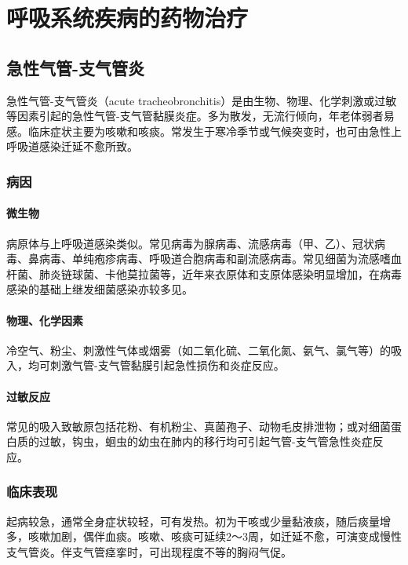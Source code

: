 \chapter{呼吸系统疾病的药物治疗}

\section{急性气管-支气管炎}

急性气管-支气管炎（acute
tracheobronchitis）是由生物、物理、化学刺激或过敏等因素引起的急性气管-支气管黏膜炎症。多为散发，无流行倾向，年老体弱者易感。临床症状主要为咳嗽和咳痰。常发生于寒冷季节或气候突变时，也可由急性上呼吸道感染迁延不愈所致。

\subsection{病因}

\subsubsection{微生物}

病原体与上呼吸道感染类似。常见病毒为腺病毒、流感病毒（甲、乙）、冠状病毒、鼻病毒、单纯疱疹病毒、呼吸道合胞病毒和副流感病毒。常见细菌为流感嗜血杆菌、肺炎链球菌、卡他莫拉菌等，近年来衣原体和支原体感染明显增加，在病毒感染的基础上继发细菌感染亦较多见。

\subsubsection{物理、化学因素}

冷空气、粉尘、刺激性气体或烟雾（如二氧化硫、二氧化氮、氨气、氯气等）的吸入，均可刺激气管-支气管黏膜引起急性损伤和炎症反应。

\subsubsection{过敏反应}

常见的吸入致敏原包括花粉、有机粉尘、真菌孢子、动物毛皮排泄物；或对细菌蛋白质的过敏，钩虫，蛔虫的幼虫在肺内的移行均可引起气管-支气管急性炎症反应。

\subsection{临床表现}

起病较急，通常全身症状较轻，可有发热。初为干咳或少量黏液痰，随后痰量增多，咳嗽加剧，偶伴血痰。咳嗽、咳痰可延续2～3周，如迁延不愈，可演变成慢性支气管炎。伴支气管痉挛时，可出现程度不等的胸闷气促。

